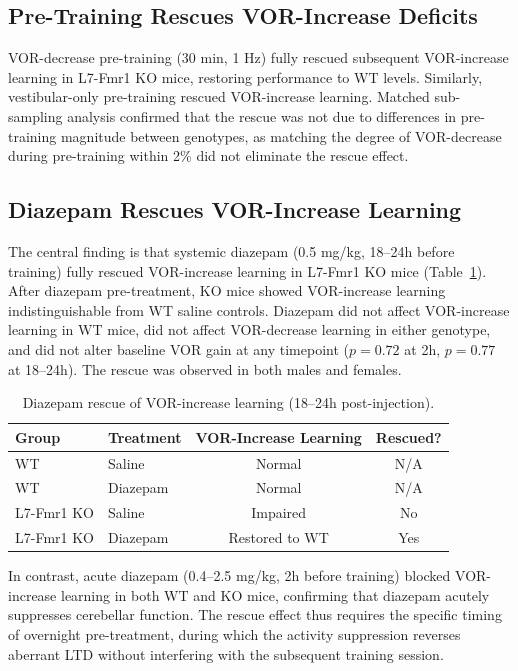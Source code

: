 \documentclass[11pt]{article}
\begin{document}
\subsection{Pre-Training Rescues VOR-Increase Deficits}

VOR-decrease pre-training (30 min, 1 Hz) fully rescued subsequent VOR-increase learning in L7-Fmr1 KO mice, restoring performance to WT levels. Similarly, vestibular-only pre-training rescued VOR-increase learning. Matched sub-sampling analysis confirmed that the rescue was not due to differences in pre-training magnitude between genotypes, as matching the degree of VOR-decrease during pre-training within 2\% did not eliminate the rescue effect.

\subsection{Diazepam Rescues VOR-Increase Learning}

The central finding is that systemic diazepam (0.5 mg/kg, 18--24h before training) fully rescued VOR-increase learning in L7-Fmr1 KO mice (Table~\ref{tab:diazepam}). After diazepam pre-treatment, KO mice showed VOR-increase learning indistinguishable from WT saline controls. Diazepam did not affect VOR-increase learning in WT mice, did not affect VOR-decrease learning in either genotype, and did not alter baseline VOR gain at any timepoint ($p = 0.72$ at 2h, $p = 0.77$ at 18--24h). The rescue was observed in both males and females.

\begin{table}[h]
\centering
\caption{Diazepam rescue of VOR-increase learning (18--24h post-injection).}
\label{tab:diazepam}
\begin{tabular}{llcc}
\toprule
Group & Treatment & VOR-Increase Learning & Rescued? \\
\midrule
WT & Saline & Normal & N/A \\
WT & Diazepam & Normal & N/A \\
L7-Fmr1 KO & Saline & Impaired & No \\
L7-Fmr1 KO & Diazepam & Restored to WT & Yes \\
\bottomrule
\end{tabular}
\end{table}

In contrast, acute diazepam (0.4--2.5 mg/kg, 2h before training) blocked VOR-increase learning in both WT and KO mice, confirming that diazepam acutely suppresses cerebellar function. The rescue effect thus requires the specific timing of overnight pre-treatment, during which the activity suppression reverses aberrant LTD without interfering with the subsequent training session.
\end{document}
